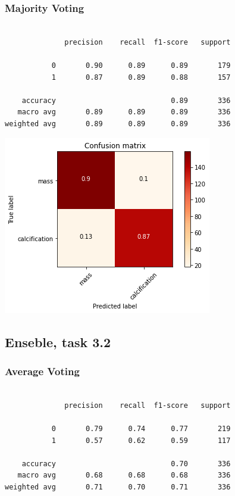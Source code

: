 \documentclass{article}
\begin{document}
\subsubsection{Majority Voting}
\begin{verbatim}

              precision    recall  f1-score   support

           0       0.90      0.89      0.89       179
           1       0.87      0.89      0.88       157

    accuracy                           0.89       336
   macro avg       0.89      0.89      0.89       336
weighted avg       0.89      0.89      0.89       336

\end{verbatim}

\begin{center}
\begin{minipage}{0.45\textwidth}
        \includegraphics[scale=0.6]{./img/cmEnsMaj3_1.png}
    \end{minipage}
\end{center}



\subsection{Enseble, task 3.2}
\subsubsection{Average Voting}

\begin{verbatim}

              precision    recall  f1-score   support

           0       0.79      0.74      0.77       219
           1       0.57      0.62      0.59       117

    accuracy                           0.70       336
   macro avg       0.68      0.68      0.68       336
weighted avg       0.71      0.70      0.71       336

\end{verbatim}
\end{document}
